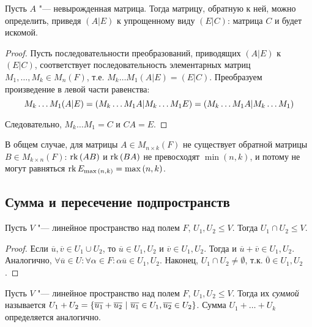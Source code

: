 \begin{corollary}
 	Пусть $A$ "--- невырожденная матрица. Тогда матрицу, обратную к ней, можно определить, приведя $(A|E)$ к упрощенному виду $(E|C)$: матрица $C$ и будет искомой.
\end{corollary}

\begin{proof}
	Пусть последовательности преобразований, приводящих $(A|E)$ к $(E|C)$, соответствует последовательность элементарных матриц $M_1, \dots, M_{k} \in M_n(F)$, т.\:е. $M_k\dots M_1(A|E) = (E|C)$. Преобразуем произведение в левой части равенства:
	\[M_k\dots M_1(A|E) \hm{=} (M_k\dots M_1A|M_k\dots M_1E) = (M_k\dots M_1A|M_k\dots M_1)\]
	
	Следовательно, $M_k\dots M_1 = C$ и $CA = E$.
\end{proof}

\begin{note}
	В общем случае, для матрицы $A \in M_{n \times k}(F)$ не существует обратной матрицы $B \in M_{k \times n}(F)$: $\operatorname{rk}{(AB)}$ и $\operatorname{rk}{(BA)}$ не превосходят $\min{(n, k)}$, и потому не могут равняться $\rk{E_{\max{(n, k)}}} \hm{=} \max{(n, k)}$.
\end{note}

\subsection{Сумма и пересечение подпространств}

\begin{proposition}
	Пусть $V$ "--- линейное пространство над полем $F$, $U_1, U_2 \le V$. Тогда $U_1 \cap U_2 \le V$.
\end{proposition}

\begin{proof}
	Если $\overline{u}, \overline{v} \in U_1 \cup U_2$, то $\overline{u} \in U_1, U_2$ и $\overline{v} \in U_1, U_2$. Тогда и $\overline{u} + \overline{v} \in U_1, U_2$. Аналогично, $\forall \overline{u} \in U: \forall \alpha \in F: \alpha\overline{u} \in U_1, U_2$. Наконец, $U_1 \cap U_2 \ne \emptyset$, т.\:к. $\overline{0} \in U_1, U_2$.
\end{proof}

\begin{definition}
	Пусть $V$ "--- линейное пространство над полем  $F$, $U_1, U_2 \le V$. Тогда их \textit{суммой} называется $U_1 + U_2 = \{\overline{u_1} + \overline{u_2}~|~\overline{u_1} \hm{\in} U_1, \overline{u_2} \in U_2\}$. Сумма $U_1 + \dots + U_k$ определяется аналогично.
\end{definition}

